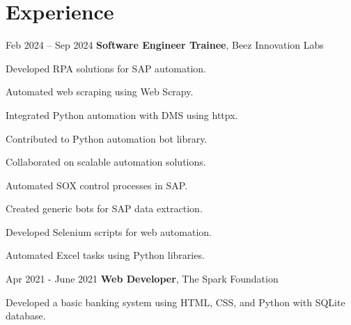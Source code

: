 \section{Experience}
\begin{twocolentry}{
    Feb 2024 – Sep 2024
}
    \textbf{Software Engineer Trainee}, Beez Innovation Labs\end{twocolentry}
\vspace{0.10 cm}
\begin{onecolentry}
    \begin{highlights}
        \item Developed RPA solutions for SAP automation.
        \item Automated web scraping using Web Scrapy.
        \item Integrated Python automation with DMS using httpx.
        \item Contributed to Python automation bot library.
        \item Collaborated on scalable automation solutions.
        \item Automated SOX control processes in SAP.
        \item Created generic bots for SAP data extraction.
        \item Developed Selenium scripts for web automation.
        \item Automated Excel tasks using Python libraries.
    \end{highlights}
\end{onecolentry}
\vspace{0.2 cm}
\begin{twocolentry}{
    Apr 2021 - June 2021
}
    \textbf{Web Developer}, The Spark Foundation\end{twocolentry}
\vspace{0.10 cm}
\begin{onecolentry}
    \begin{highlights}
        \item Developed a basic banking system using HTML, CSS,
          and Python with SQLite database.
    \end{highlights}
\end{onecolentry}


